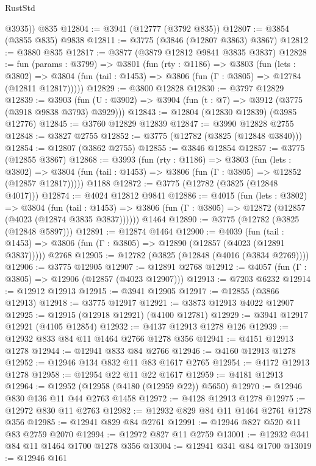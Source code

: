 \begin{lexlean}{RustStd}
\begin{coremodule}
{\begin{coremodule}
{{{{{{{{{{{{{{{{{{{{{{{{{{{{{{{        @3935))
    @835
@12804 := @3941 (@12777 (@3792 @835))
@12807 := @3854 (@3855 @835) @9838
@12811 := @3775 (@3846 (@12807 @3863) @3867)
@12812 := @3880 @835
@12817 := @3877 (@3879 @12812 @9841 @3835 @3837)
@12828 := fun (params : @3799) =>
  @3801
    (fun (rty : @1186) =>
    @3803
      (fun (lets : @3802) =>
      @3804 (fun (tail : @1453) => @3806 (fun (Γ : @3805) => @12784 (@12811 @12817)))))
@12829 := @3800 @12828
@12830 := @3797 @12829
@12839 := @3903 (fun (U : @3902) => @3904 (fun (t : @7) => @3912 (@3775 (@3918 @9838 @3793) @3929)))
@12843 := @12804 (@12830 @12839) (@3985 @12776)
@12845 := @3760 @12829 @12839
@12847 := @3990 @12828 @2755
@12848 := @3827 @2755
@12852 := @3775 (@12782 (@3825 (@12848 @3840)))
@12854 := @12807 (@3862 @2755)
@12855 := @3846 @12854
@12857 := @3775 (@12855 @3867)
@12868 := @3993
    (fun (rty : @1186) =>
    @3803
      (fun (lets : @3802) =>
      @3804 (fun (tail : @1453) => @3806 (fun (Γ : @3805) => @12852 (@12857 @12817)))))
    @1188
@12872 := @3775 (@12782 (@3825 (@12848 @4017)))
@12874 := @4024 @12812 @9841
@12886 := @4015
    (fun (lets : @3802) =>
    @3804
      (fun (tail : @1453) =>
      @3806 (fun (Γ : @3805) => @12872 (@12857 (@4023 (@12874 @3835 @3837))))))
    @1464
@12890 := @3775 (@12782 (@3825 (@12848 @5897)))
@12891 := @12874 @1464
@12900 := @4039
    (fun (tail : @1453) => @3806 (fun (Γ : @3805) => @12890 (@12857 (@4023 (@12891 @3837)))))
    @2768
@12905 := @12782 (@3825 (@12848 (@4016 (@3834 @2769))))
@12906 := @3775 @12905
@12907 := @12891 @2768
@12912 := @4057 (fun (Γ : @3805) => @12906 (@12857 (@4023 @12907)))
@12913 := @7203 @6232
@12914 := @12912 @12913
@12915 := @3941 @12905
@12917 := @12855 (@3866 @12913)
@12918 := @3775 @12917
@12921 := @3873 @12913 @4022 @12907
@12925 := @12915 (@12918 @12921) (@4100 @12781)
@12929 := @3941 @12917 @12921 (@4105 @12854)
@12932 := @4137 @12913 @1278 @126
@12939 := @12932 @833 @84 @11 @1464 @2766 @1278 @356
@12941 := @4151 @12913 @1278
@12944 := @12941 @833 @84 @2766
@12946 := @4160 @12913 @1278
@12952 := @12946 @134 @832 @11 @83 @1617 @2765
@12954 := @4172 @12913 @1278
@12958 := @12954 @22 @11 @22 @1617
@12959 := @4181 @12913
@12964 := @12952 (@12958 (@4180 (@12959 @22)) @5650)
@12970 := @12946 @830 @136 @11 @44 @2763 @1458
@12972 := @4128 @12913 @1278
@12975 := @12972 @830 @11 @2763
@12982 := @12932 @829 @84 @11 @1464 @2761 @1278 @356
@12985 := @12941 @829 @84 @2761
@12991 := @12946 @827 @520 @11 @83 @2759 @2070
@12994 := @12972 @827 @11 @2759
@13001 := @12932 @341 @84 @11 @1464 @1700 @1278 @356
@13004 := @12941 @341 @84 @1700
@13019 := @12946
    @161
}}}}}}}}}}}}}}}}}}}}}}}}}}}}}}}
\end{coremodule}}
\end{coremodule}
\end{lexlean}
